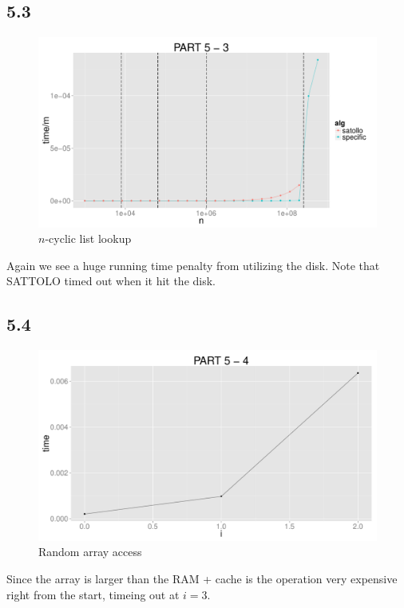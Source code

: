 \documentclass{article}
\begin{document}
\subsection*{5.3}
\begin{figure}[H]
    \centering
    \includegraphics[width=\textwidth]{images/part5_3.pdf}
    \caption{$n$-cyclic list lookup}
    \label{fig:awesome_image}
\end{figure}
Again we see a huge running time penalty from utilizing the disk. Note that 
SATTOLO timed out when it hit the disk. 
\newline
\subsection*{5.4}
\begin{figure}[H]
    \centering
    \includegraphics[width=\textwidth]{images/part5_4.pdf}
    \caption{Random array access}
    \label{fig:awesome_image}
\end{figure}
Since the array is larger than the RAM + cache is the 
operation very expensive right from the start, timeing out at $i = 3$. 
%
\end{document}
